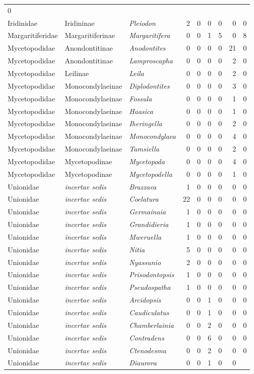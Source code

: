 \documentclass[11pt]{article}
\begin{document}
\begin{longtable}[l]{@{}lllrrrrrr@{}}
0\tabularnewline
Iridinidae & Iridininae & \textit{Pleiodon} & 2 & 0 & 0 & 0 & 0 &
0\tabularnewline
Margaritiferidae & Margaritiferinae & \textit{Margaritifera} & 0 & 0 & 1 &
5 & 0 & 8\tabularnewline
Mycetopodidae & Anondontitinae & \textit{Anodontites} & 0 & 0 & 0 & 0 & 21
& 0\tabularnewline
Mycetopodidae & Anondontitinae & \textit{Lamproscapha} & 0 & 0 & 0 & 0 & 2
& 0\tabularnewline
Mycetopodidae & Leilinae & \textit{Leila} & 0 & 0 & 0 & 0 & 2 &
0\tabularnewline
Mycetopodidae & Monocondylaeinae & \textit{Diplodontites} & 0 & 0 & 0 & 0
& 3 & 0\tabularnewline
Mycetopodidae & Monocondylaeinae & \textit{Fossula} & 0 & 0 & 0 & 0 & 1 &
0\tabularnewline
Mycetopodidae & Monocondylaeinae & \textit{Haasica} & 0 & 0 & 0 & 0 & 1 &
0\tabularnewline
Mycetopodidae & Monocondylaeinae & \textit{Iheringella} & 0 & 0 & 0 & 0 &
2 & 0\tabularnewline
Mycetopodidae & Monocondylaeinae & \textit{Monocondylaea} & 0 & 0 & 0 & 0
& 4 & 0\tabularnewline
Mycetopodidae & Monocondylaeinae & \textit{Tamsiella} & 0 & 0 & 0 & 0 & 2
& 0\tabularnewline
Mycetopodidae & Mycetopodinae & \textit{Mycetopoda} & 0 & 0 & 0 & 0 & 4 &
0\tabularnewline
Mycetopodidae & Mycetopodinae & \textit{Mycetopodella} & 0 & 0 & 0 & 0 & 1
& 0\tabularnewline
Unionidae & \textit{incertae sedis} & \textit{Brazzaea} & 1 & 0 & 0 & 0 & 0
& 0\tabularnewline
Unionidae & \textit{incertae sedis} & \textit{Coelatura} & 22 & 0 & 0 & 0 &
0 & 0\tabularnewline
Unionidae & \textit{incertae sedis} & \textit{Germainaia} & 1 & 0 & 0 & 0 &
0 & 0\tabularnewline
Unionidae & \textit{incertae sedis} & \textit{Grandidieria} & 1 & 0 & 0 & 0
& 0 & 0\tabularnewline
Unionidae & \textit{incertae sedis} & \textit{Mweruella} & 1 & 0 & 0 & 0 & 0
& 0\tabularnewline
Unionidae & \textit{incertae sedis} & \textit{Nitia} & 5 & 0 & 0 & 0 & 0 &
0\tabularnewline
Unionidae & \textit{incertae sedis} & \textit{Nyassunio} & 2 & 0 & 0 & 0 & 0
& 0\tabularnewline
Unionidae & \textit{incertae sedis} & \textit{Prisodontopsis} & 1 & 0 & 0 &
0 & 0 & 0\tabularnewline
Unionidae & \textit{incertae sedis} & \textit{Pseudospatha} & 1 & 0 & 0 & 0
& 0 & 0\tabularnewline
Unionidae & \textit{incertae sedis} & \textit{Arcidopsis} & 0 & 0 & 1 & 0 &
0 & 0\tabularnewline
Unionidae & \textit{incertae sedis} & \textit{Caudiculatus} & 0 & 0 & 1 & 0
& 0 & 0\tabularnewline
Unionidae & \textit{incertae sedis} & \textit{Chamberlainia} & 0 & 0 & 2 & 0
& 0 & 0\tabularnewline
Unionidae & \textit{incertae sedis} & \textit{Contradens} & 0 & 0 & 6 & 0 &
0 & 0\tabularnewline
Unionidae & \textit{incertae sedis} & \textit{Ctenodesma} & 0 & 0 & 2 & 0 &
0 & 0\tabularnewline
Unionidae & \textit{incertae sedis} & \textit{Diaurora} & 0 & 0 & 1 & 0 & 0

\end{longtable}
\end{document}
